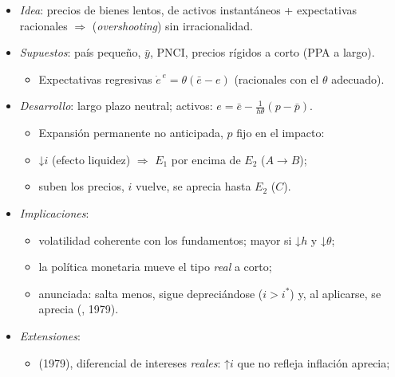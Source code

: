 \documentclass{article}
\begin{document}
\begin{columnas}
\begin{itemize}
\item \emph{Idea}: precios de bienes lentos, de activos instantáneos + expectativas racionales $\Rightarrow$  (\emph{overshooting}) sin irracionalidad.
\item \emph{Supuestos}: país pequeño, $\bar y$, PNCI, precios rígidos a corto (PPA a largo).
  \begin{itemize}
  \item Expectativas regresivas $\dot e^{\,e}=\theta(\bar e-e)$ (racionales con el $\theta$ adecuado).
  \end{itemize}
\item \emph{Desarrollo}: largo plazo neutral; activos: $e=\bar e-\frac{1}{h\theta}(p-\bar p)$.
  \begin{itemize}
  \item Expansión permanente no anticipada, $p$ fijo en el impacto:
  \item ↓$i$ (efecto liquidez) $\Rightarrow$ $E_1$ por encima de $E_2$ ($A\to B$);
  \item suben los precios, $i$ vuelve, se aprecia hasta $E_2$ ($C$).
  \end{itemize}
\end{itemize}
\begin{itemize}
\item \emph{Implicaciones}:
  \begin{itemize}
  \item volatilidad coherente con los fundamentos; mayor si ↓$h$ y ↓$\theta$;
  \item la política monetaria mueve el tipo \emph{real} a corto;
  \item anunciada: salta menos, sigue depreciándose ($i>i^*$) y, al aplicarse, se aprecia (, 1979).
  \end{itemize}
\end{itemize}
\begin{itemize}
\item \emph{Extensiones}:
  \begin{itemize}
  \item {} (1979), diferencial de intereses \emph{reales}: ↑$i$ que no refleja inflación aprecia;

\end{itemize}
\end{itemize}
\end{columnas}
\end{document}

